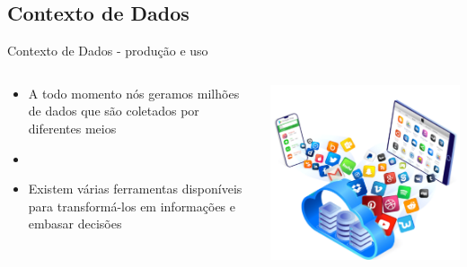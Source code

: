 \documentclass[10pt,brazil]{beamer}
\theoremstyle{definition}
\begin{document}
\subsection*{Contexto de Dados}
\begin{frame}{Contexto de Dados - produção e uso}
  \begin{columns}
    \begin{column}{0.5\textwidth}
      \begin{itemize}
        \item[] A todo momento nós geramos milhões de dados que são coletados por diferentes meios
        \item[]
        \item[] Existem várias ferramentas disponíveis para transformá-los em informações e embasar decisões
      \end{itemize}
    \end{column}
    \begin{column}{0.5\textwidth}
      \begin{center}
        \includegraphics[width=1\textwidth]{sis.png}
      \end{center}
    \end{column}
  \end{columns}
\end{frame}  
\end{document}
